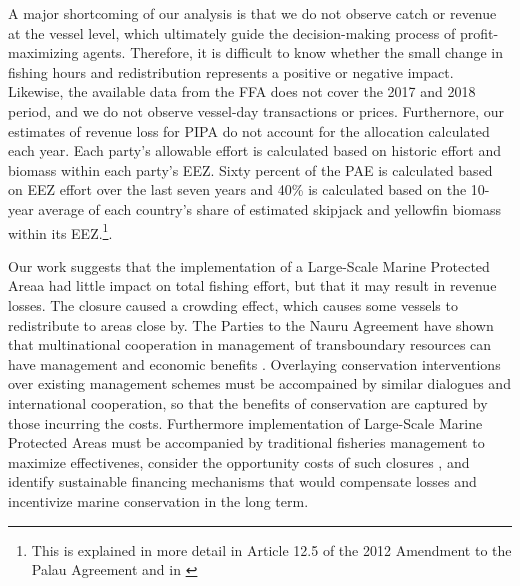 \documentclass[9p,twocolumn,twoside,lineno]{pnas-new}
\begin{document}
A major shortcoming of our analysis is that we do not observe catch or revenue at the vessel level, which ultimately guide the decision-making process of profit-maximizing agents. Therefore, it is difficult to know whether the small change in fishing hours and redistribution represents a positive or negative impact. Likewise, the available data from the FFA does not cover the 2017 and 2018 period, and we do not observe vessel-day transactions or prices. Furthernore, our estimates of revenue loss for PIPA do not account for the allocation calculated each year. Each party’s allowable effort is calculated based on historic effort and biomass within each party’s EEZ. Sixty percent of the PAE is calculated based on EEZ effort over the last seven years and 40\% is calculated based on the 10-year average of each country’s share of estimated skipjack and yellowfin biomass within its EEZ.\footnote{This is explained in more detail in Article 12.5 of the 2012 Amendment to the Palau Agreement and in \cite{Hagrannsoknir2014}}.

Our work suggests that the implementation of a Large-Scale Marine Protected Areaa had little impact on total fishing effort, but that it may result in revenue losses. The closure caused a crowding effect, which causes some vessels to redistribute to areas close by. The Parties to the Nauru Agreement have shown that multinational cooperation in management of transboundary resources can have management and economic benefits \cite{lhavice_2013,aqorau_2018}. Overlaying conservation interventions over existing management schemes must be accompained by similar dialogues and international cooperation, so that the benefits of conservation are captured by those incurring the costs. Furthermore implementation of Large-Scale Marine Protected Areas must be accompanied by traditional fisheries management to maximize effectivenes, consider the opportunity costs of such closures \cite{smith_2010}, and identify sustainable financing mechanisms\cite{mallin_2019} that would compensate losses and incentivize marine conservation in the long term.
\end{document}
